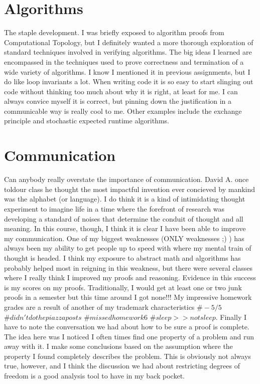 \documentclass{article}
\begin{document}
\section{Algorithms}
The staple development. I was briefly exposed to algorithm proofs from Computational Topology, but I definitely wanted a more thorough exploration of standard techniques involved in verifying algorithms. The big ideas I learned are encompassed in the techniques used to prove correctness and termination of a wide variety of algorithms. I know I mentioned it in previous assignments, but I do like loop invariants a lot. When writing code it is so easy to start slinging out code without thinking too much about why it is right, at least for me. I can always convice myself it is correct, but pinning down the justification in a communicable way is really cool to me. Other examples include the exchange principle and stochastic expected runtime algorithms. 

\section{Communication}
Can anybody really overstate the importance of communication. David A. once toldour class he thought the most impactful invention ever concieved by mankind was the alphabet (or language). I do think it is a kind of intimidating thought experiment to imagine life in a time where the forefront of research was developing a standard of noises that determine the conduit of thought and all meaning. In this course, though, I think it is clear I have been able to improve my communication. One of my biggest weaknesses (ONLY weaknesses ;) ) has always been my ability to get people up to speed with where my mental train of thought is headed. I think my exposure to abstract math and algorithms has probably helped most in reigning in this weakness, but there were several classes where I really think I improved my proofs and reasoning. Evidence in this success is my scores on my proofs. Traditionally, I would get at least one or two junk proofs in a semester but this time around I got none!!! My impressive homework grades are a result of another of my trademark characteristics $\#-5/5$ $\#didn'tdothepiazzaposts$ $\#missedhomework6$ $\#sleep>>notsleep$. 
Finally I have to note the conversation we had about how to be sure a proof is complete. The idea here was I noticed I often times find one property of a problem and run away with it. I make some conclusions based on the assumption where the property I found completely describes the problem. This is obviously not always true, however, and I think the discussion we had about restricting degrees of freedom is a good analysis tool to have in my back pocket. 
\end{document}
